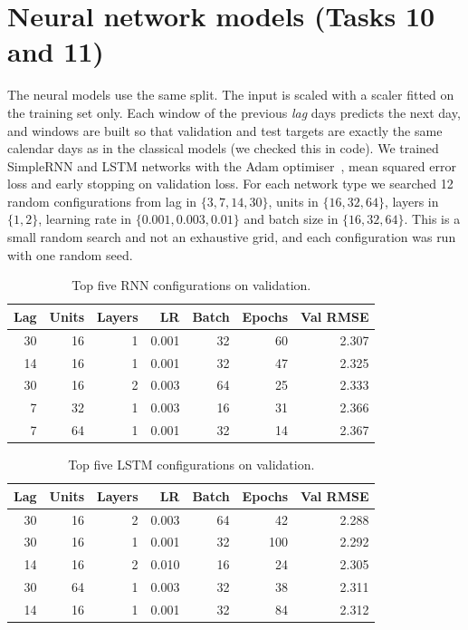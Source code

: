 \documentclass[11pt,a4paper]{article}
\begin{document}
\section{Neural network models (Tasks 10 and 11)}
The neural models use the same split. The input is scaled with a scaler fitted on the training set only. Each window of the previous \emph{lag} days predicts the next day, and windows are built so that validation and test targets are exactly the same calendar days as in the classical models (we checked this in code). We trained SimpleRNN and LSTM networks with the Adam optimiser~\cite{adam}, mean squared error loss and early stopping on validation loss. For each network type we searched 12 random configurations from lag in $\{3,7,14,30\}$, units in $\{16,32,64\}$, layers in $\{1,2\}$, learning rate in $\{0.001,0.003,0.01\}$ and batch size in $\{16,32,64\}$. This is a small random search and not an exhaustive grid, and each configuration was run with one random seed.

\begin{table}[H]\centering
\caption{Top five RNN configurations on validation.}
\begin{tabular}{rrrrrrr}
\toprule
Lag & Units & Layers & LR & Batch & Epochs & Val RMSE\\
\midrule
30 & 16 & 1 & 0.001 & 32 & 60 & 2.307\\
14 & 16 & 1 & 0.001 & 32 & 47 & 2.325\\
30 & 16 & 2 & 0.003 & 64 & 25 & 2.333\\
7 & 32 & 1 & 0.003 & 16 & 31 & 2.366\\
7 & 64 & 1 & 0.001 & 32 & 14 & 2.367\\
\bottomrule
\end{tabular}
\end{table}

\begin{table}[H]\centering
\caption{Top five LSTM configurations on validation.}
\begin{tabular}{rrrrrrr}
\toprule
Lag & Units & Layers & LR & Batch & Epochs & Val RMSE\\
\midrule
30 & 16 & 2 & 0.003 & 64 & 42 & 2.288\\
30 & 16 & 1 & 0.001 & 32 & 100 & 2.292\\
14 & 16 & 2 & 0.010 & 16 & 24 & 2.305\\
30 & 64 & 1 & 0.003 & 32 & 38 & 2.311\\
14 & 16 & 1 & 0.001 & 32 & 84 & 2.312\\
\bottomrule
\end{tabular}
\end{table}
\end{document}
